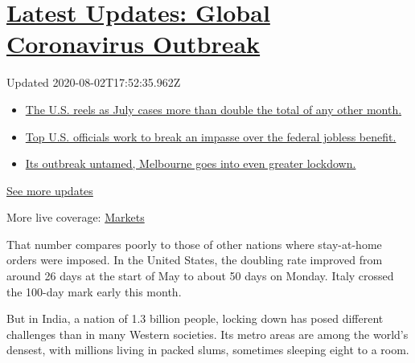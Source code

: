 \hypertarget{latest-updates-global-coronavirus-outbreak}{%
\section{\texorpdfstring{\href{https://www.nytimes.com/2020/08/01/world/coronavirus-covid-19.html?action=click\&pgtype=Article\&state=default\&region=MAIN_CONTENT_1\&context=storylines_live_updates}{Latest
Updates: Global Coronavirus
Outbreak}}{Latest Updates: Global Coronavirus Outbreak}}\label{latest-updates-global-coronavirus-outbreak}}

Updated 2020-08-02T17:52:35.962Z

\begin{itemize}
\tightlist
\item
  \href{https://www.nytimes.com/2020/08/01/world/coronavirus-covid-19.html?action=click\&pgtype=Article\&state=default\&region=MAIN_CONTENT_1\&context=storylines_live_updates\#link-34047410}{The
  U.S. reels as July cases more than double the total of any other
  month.}
\item
  \href{https://www.nytimes.com/2020/08/01/world/coronavirus-covid-19.html?action=click\&pgtype=Article\&state=default\&region=MAIN_CONTENT_1\&context=storylines_live_updates\#link-780ec966}{Top
  U.S. officials work to break an impasse over the federal jobless
  benefit.}
\item
  \href{https://www.nytimes.com/2020/08/01/world/coronavirus-covid-19.html?action=click\&pgtype=Article\&state=default\&region=MAIN_CONTENT_1\&context=storylines_live_updates\#link-2bc8948}{Its
  outbreak untamed, Melbourne goes into even greater lockdown.}
\end{itemize}

\href{https://www.nytimes.com/2020/08/01/world/coronavirus-covid-19.html?action=click\&pgtype=Article\&state=default\&region=MAIN_CONTENT_1\&context=storylines_live_updates}{See
more updates}

More live coverage:
\href{https://www.nytimes.com/live/2020/07/31/business/stock-market-today-coronavirus?action=click\&pgtype=Article\&state=default\&region=MAIN_CONTENT_1\&context=storylines_live_updates}{Markets}

That number compares poorly to those of other nations where stay-at-home
orders were imposed. In the United States, the doubling rate improved
from around 26 days at the start of May to about 50 days on Monday.
Italy crossed the 100-day mark early this month.

But in India, a nation of 1.3 billion people, locking down has posed
different challenges than in many Western societies. Its metro areas are
among the world's densest, with millions living in packed slums,
sometimes sleeping eight to a room.

